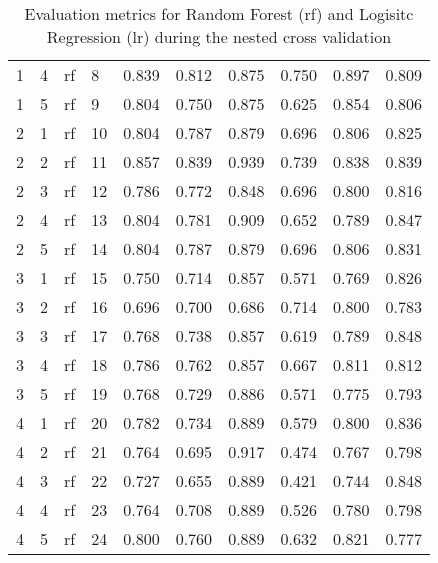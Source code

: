 \begin{table}[ht]
\begin{adjustbox}{width=\textwidth}
\begin{tabular}{llllrrrrrr}
   1 &           4 &    rf &           8 & 0.839 &  0.812 &        0.875 &       
 0.750 & 0.897 & 0.809 \\
   1 &           5 &    rf &           9 & 0.804 &  0.750 &        0.875 &       
 0.625 & 0.854 & 0.806 \\
   2 &           1 &    rf &          10 & 0.804 &  0.787 &        0.879 &       
 0.696 & 0.806 & 0.825 \\
   2 &           2 &    rf &          11 & 0.857 &  0.839 &        0.939 &       
 0.739 & 0.838 & 0.839 \\
   2 &           3 &    rf &          12 & 0.786 &  0.772 &        0.848 &       
 0.696 & 0.800 & 0.816 \\
   2 &           4 &    rf &          13 & 0.804 &  0.781 &        0.909 &       
 0.652 & 0.789 & 0.847 \\
   2 &           5 &    rf &          14 & 0.804 &  0.787 &        0.879 &       
 0.696 & 0.806 & 0.831 \\
   3 &           1 &    rf &          15 & 0.750 &  0.714 &        0.857 &       
 0.571 & 0.769 & 0.826 \\
   3 &           2 &    rf &          16 & 0.696 &  0.700 &        0.686 &       
 0.714 & 0.800 & 0.783 \\
   3 &           3 &    rf &          17 & 0.768 &  0.738 &        0.857 &       
 0.619 & 0.789 & 0.848 \\
   3 &           4 &    rf &          18 & 0.786 &  0.762 &        0.857 &       
 0.667 & 0.811 & 0.812 \\
   3 &           5 &    rf &          19 & 0.768 &  0.729 &        0.886 &       
 0.571 & 0.775 & 0.793 \\
   4 &           1 &    rf &          20 & 0.782 &  0.734 &        0.889 &       
 0.579 & 0.800 & 0.836 \\
   4 &           2 &    rf &          21 & 0.764 &  0.695 &        0.917 &       
 0.474 & 0.767 & 0.798 \\
   4 &           3 &    rf &          22 & 0.727 &  0.655 &        0.889 &       
 0.421 & 0.744 & 0.848 \\
   4 &           4 &    rf &          23 & 0.764 &  0.708 &        0.889 &       
 0.526 & 0.780 & 0.798 \\
   4 &           5 &    rf &          24 & 0.800 &  0.760 &        0.889 &       
 0.632 & 0.821 & 0.777 \\
\end{tabular}
\end{adjustbox}
\caption{Evaluation metrics for Random Forest (rf) and Logisitc Regression (lr) 
during the nested cross validation}
\label{tab:storage}
\end{table}
